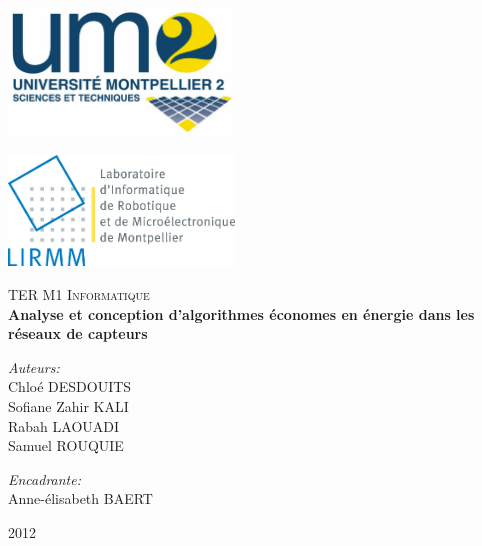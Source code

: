 \documentclass[a4paper]{report}
\theoremstyle{definition}
\begin{document}
\normalsize
{}


\begin{titlepage}

\begin{minipage}[c][4cm][t]{7.8cm}
\raggedright 
\includegraphics[width=6cm]{./logo_um2}
\end{minipage}
\begin{minipage}[c][4cm][t]{7.8cm}
\raggedleft
\includegraphics[width=6cm]{./LogoLIRMM}
\end{minipage}

\vfill

\begin{center}
\textsc{\Large TER M1 Informatique}\\[0.5cm]

\hspace{0.4cm}
{ \huge \bfseries Analyse et conception d'algorithmes \'economes en \'energie dans les r\'eseaux de capteurs}\\[3cm]

\begin{minipage}[c][4cm][t]{0.4\textwidth}
\raggedright \large
\emph{Auteurs:}\\
Chlo\'e DESDOUITS\\
Sofiane Zahir KALI\\
Rabah LAOUADI\\
Samuel ROUQUIE
\end{minipage}
\begin{minipage}[c][4cm][t]{0.4\textwidth}
\raggedleft \large
\emph{Encadrante:} \\
Anne-\'elisabeth BAERT
\end{minipage}

\vfill
{\large 2012}
\end{center}
\end{titlepage}
\end{document}
